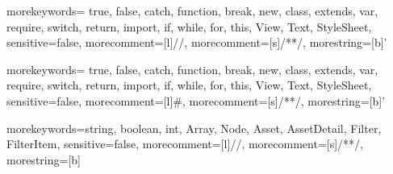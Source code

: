 
\renewcommand{\lstlistingname}{Codice}%
\renewcommand{\lstlistlistingname}{Frammenti di codice}%

\lstset{style=mystyle}

{
  morekeywords={ true, false, catch, function, break,	new, class, extends, var, require, switch, return, import, if, while, for, this, View, Text, StyleSheet},
  sensitive=false, %
  morecomment=[l]{//}, %
  morecomment=[s]{/*}{*/}, %
  morestring=[b]' %
}

{
	morekeywords={ true, false, catch, function, break,	new, class, extends, var, require, switch, return, import, if, while, for, this, View, Text, StyleSheet},
	sensitive=false, %
	morecomment=[l]{\#}, %
	morecomment=[s]{/*}{*/}, %
	morestring=[b]' %
}

{
  morekeywords={string, boolean, int, Array, Node, Asset, AssetDetail, Filter, FilterItem},
  sensitive=false, %
  morecomment=[l]{//}, %
  morecomment=[s]{/*}{*/}, %
  morestring=[b] %
}

